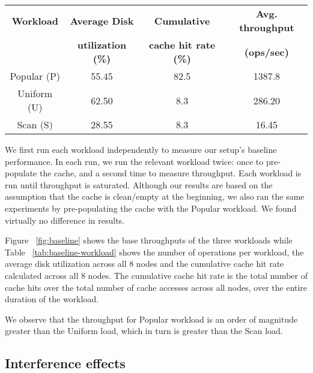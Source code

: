 \documentclass[twocolumn]{article}
\begin{document}
\begin{table*}[ht!]\footnotesize
\centering
\begin{tabular}{ | c | c | c | c |   }
  \hline
\textbf{Workload} & \textbf{Average Disk } & \textbf{Cumulative} & \textbf{Avg. throughput} \\
            & \textbf{utilization (\%)} & \textbf{cache hit rate (\%)} & \textbf{(ops/sec)}\\
\hline
Popular (P)  & 55.45 & 82.5 & 1387.8 \\
Uniform (U)  & 62.50 & 8.3 & 286.20 \\
Scan (S) & 28.55 & 8.3 & 16.45 \\ 
\hline
\end{tabular}
\caption{Baseline workload statistics}  
\label{tab:baseline-workload}
\end{table*}

We first run each workload independently to measure our setup's baseline performance. 
In each run, we run the relevant workload twice: once to pre-populate the cache, and a second time to measure throughput. Each workload is run until throughput is saturated. Although our results are based on the assumption that the cache is clean/empty at the beginning, we also ran the same experiments by pre-populating the cache with the Popular workload. We found virtually no difference in results.

Figure ~\ref{fig:baseline} shows the base throughputs of the three workloads while Table ~\ref{tab:baseline-workload} shows the number of operations per workload, the average disk utilization across all 8 nodes and the cumulative cache hit rate calculated across all 8 nodes. The cumulative cache hit rate is the total number of cache hits over the total number of cache accesses across all nodes, over the entire duration of the workload.

We observe that the throughput for Popular workload is an order of magnitude greater than the Uniform load, which in turn is greater than the Scan load. 

\subsection{Interference effects}
\end{document}
